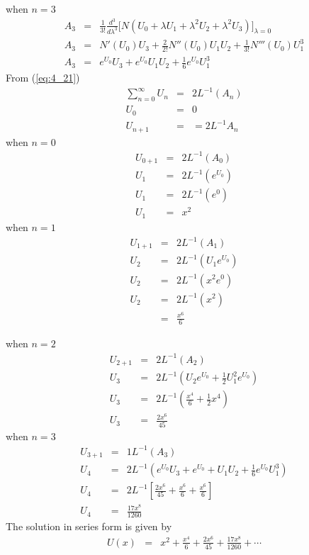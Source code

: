 \documentclass[11pt]{report}
\newcommand{\sps}{\\[0.2cm]}
\newcommand{\refn}[1]{(\ref{#1})}
\newcommand{\refx}[1]{\refn{eq:#1}}
\newcommand{\sprime}{'}
\newcommand{\dprime}{''}
\newcommand{\tprime}{'''}
\begin{document}
	when $n=3$
	\begin{eqnarray*}
		A_3 &=&\frac{1}{3!}\frac{d^3}{d\lambda^3}\Big[N (U_0+ \lambda U_1 + \lambda^2U_2+\lambda^2U_3)\Big]_{\lambda=0}\sps
		A_3 &=& N\sprime(U_0)U_3 + \frac{2}{2!}N\dprime(U_0)U_1U_2 + \frac{1}{3!}N\tprime(U_0)U_1^3\sps
		A_3 &=& e^{U_0}U_3 + e^{U_0}U_1U_2 + \frac{1}{6}e^{U_0}U_1^3
	\end{eqnarray*}
	From \refx{4_21}
	\begin{eqnarray*}
		\sum_{n=0}^\infty U_n &=& 2L^{-1}(A_n)\sps
		U_0 &=& 0\sps
		U_{n+1} &=& = 2L^{-1}A_n
	\end{eqnarray*}
	when $n=0$
	\begin{eqnarray*}
		U_{0+1} &=&2L^{-1}(A_0)\sps
		U_1 &=&2L^{-1}(e^{U_0})\sps
		U_1 &=& 2L^{-1}(e^0)\sps
		U_1 &=& x^2
	\end{eqnarray*}
	when $n=1$
	\begin{eqnarray*}
		U_{1+1} &=& 2L^{-1}(A_1)\sps
		U_2 &=& 2L^{-1}(U_1e^{U_0})\sps
		U_2 &=& 2L^{-1}(x^2e^0)\sps
		U_2 &=& 2L^{-1}(x^2)\sps
		&=& \frac{x^6}{6}
	\end{eqnarray*}

	when $n=2$
	\begin{eqnarray*}
		U_{2+1} &=& 2L^{-1}(A_2)\sps
		U_3 &=& 2L^{-1}(U_2e^{U_0}+\frac{1}{2}U_1^2e^{U_0})\sps
		U_3 &=& 2L^{-1}\left(\frac{x^4}{6} + \frac{1}{2}x^4\right)\sps
		U_3 &=& \frac{2x^6}{45}
	\end{eqnarray*}
	when $n=3$
	\begin{eqnarray*}
		U_{3+1} &=& 1L^{-1}(A_3)\sps
		U_4 &=& 2L^{-1}(e^{U_0}U_3 + e^{U_0} + U_1U_2 + \frac{1}{6}e^{U_0}U_1^3)\sps
		U_4 &=&2L^{-1}\left[ \frac{2x^6}{45} + \frac{x^6}{6} + \frac{x^6}{6}  \right]\sps
		U_4 &=& \frac{17x^8}{1260}
	\end{eqnarray*}
	The solution in series form is given by
	\begin{eqnarray*}
		U(x) &=& x^2 +  \frac{x^4}{6} + \frac{2x^6}{45} + \frac{17x^8}{1260} + \cdots
	\end{eqnarray*}

	\newpage
\end{document}
